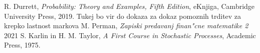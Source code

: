 \documentclass[twoside,11pt]{article}
\begin{document}
\begin{thebibliography}{99}

 R. Durrett, \emph{Probability: Theory and Examples, Fifth Edition}, eKnjiga, Cambridge University Press, 2019. 
 Tukej bo vir do dokaza za dokaz pomoznih trditev za krepko lastnost markova 
 M. Perman, \emph{Zapiski predavanj finan"cne matematike 2} 2021
 S. Karlin in H. M. Taylor, \emph{A First Course in Stochastic Processes}, Academic Press, 1975.


\end{thebibliography}
\end{document}
